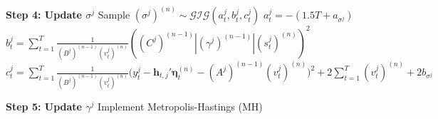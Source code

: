 \documentclass[APA,STIX1COL]{WileyNJD-v2}
\begin{document}
\begin{algorithm}
\begin{algorithmic}
        \State \textbf{Step 4: Update $\sigma^j$}
        \State Sample $(\sigma^j)^{(n)} \sim \mathcal{GIG}(a^j_t, b^j_t, c^j_t)$
        \State $a^j_t = -(1.5T + a_{\sigma^j})$
        \State $b^j_t = \sum_{t=1}^T \frac{1}{(B^j)^{(n-1)} (v^j_t)^{(n)}} \left((C^j)^{(n-1)} |(\gamma^j)^{(n-1)}| (s^j_t)^{(n)} \right)^2$
        \State $c^j_t = \sum_{t=1}^T \frac{1}{(B^j)^{(n-1)} (v^j_t)^{(n)}}\big(y_t^j -\textbf{h}_{t,j}' \boldsymbol{\eta}^{(n)}_t - (A^j)^{(n-1)} (v^j_t)^{(n)}\big)^2 + 2 \sum_{t=1}^T  (v^j_t)^{(n)} + 2 b_{\sigma^j}$

        \State \textbf{Step 5: Update $\gamma^j$}
        \State Implement Metropolis-Hastings (MH)
    \EndFor
\EndFor

\end{algorithmic}
\end{algorithm}
\end{document}
